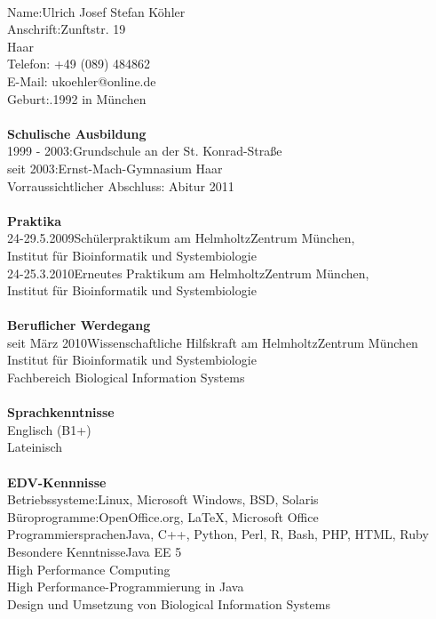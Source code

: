 \documentclass[a4paper,12pt,twoside]{scrbook}
\begin{document}
{\large\thispagestyle{empty}
\vspace*{-1cm}
\begin{tabbing}
\hspace*{5cm}\=\\
Name:\>Ulrich Josef Stefan Köhler\\
Anschrift:\>Zunftstr. 19\\
 Haar\\
\> Telefon: +49 (089) 484862\\
\> E-Mail: ukoehler@online.de\\
Geburt:.1992 in München\\\\
\hspace*{-4mm}\textbf{Schulische Ausbildung}\\
1999 - 2003:\>Grundschule an der St. Konrad-Straße\\
seit 2003:\>Ernst-Mach-Gymnasium Haar\\\>Vorraussichtlicher Abschluss: Abitur 2011\\\\
\hspace*{-4mm}\textbf{Praktika}\\
24-29.5.2009\>Schülerpraktikum am HelmholtzZentrum München,\\\>Institut für Bioinformatik und Systembiologie\\
24-25.3.2010\>Erneutes Praktikum am HelmholtzZentrum München,\\\> Institut für Bioinformatik und Systembiologie\\\\
\hspace*{-4mm}\textbf{Beruflicher Werdegang}\\
seit März 2010\>Wissenschaftliche Hilfskraft am HelmholtzZentrum München\\\>Institut für Bioinformatik und Systembiologie\\
\>Fachbereich Biological Information Systems\\\\
\hspace*{-4mm}\textbf{Sprachkenntnisse}\\
\>Englisch (B1+)\\
\>Lateinisch\\\\
\hspace*{-4mm}\textbf{EDV-Kennnisse}\\
Betriebssysteme:\>Linux, Microsoft Windows, BSD, Solaris\\
Büroprogramme:\>OpenOffice.org, \LaTeX, Microsoft Office\\
Programmiersprachen\>Java, C++, Python, Perl, R, Bash, PHP, HTML, Ruby\\
Besondere Kenntnisse\>Java EE 5\\\>High Performance Computing\\\>High Performance-Programmierung in Java\\\>Design und  Umsetzung von Biological Information Systems\\
\end{tabbing}
}
\end{document}
